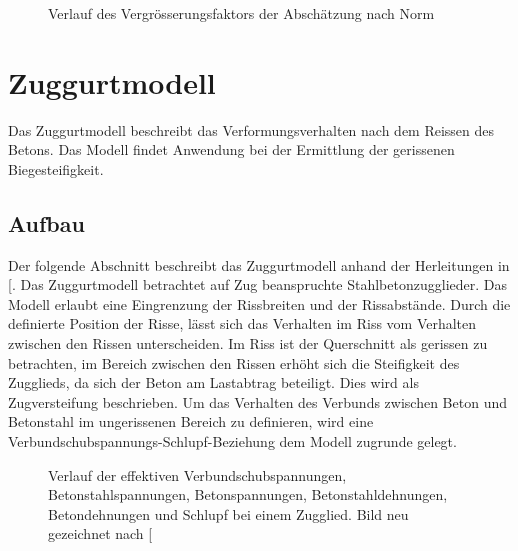 \documentclass[
  12pt,
  letterpaper,
  egregdoesnotlikesansseriftitles]{scrreprt}
\begin{document}
\begin{figure}[H]


\caption{\label{fig-fg}Verlauf des Vergrösserungsfaktors der Abschätzung
nach Norm}

\end{figure}%

\section{Zuggurtmodell}\label{sec-zuggurtmodell}

Das Zuggurtmodell beschreibt das Verformungsverhalten nach dem Reissen
des Betons. Das Modell findet Anwendung bei der Ermittlung der
gerissenen Biegesteifigkeit.

\subsection{Aufbau}\label{aufbau-2}

Der folgende Abschnitt beschreibt das Zuggurtmodell anhand der
Herleitungen in {[}\citeproc{ref-Spathelf2022}{4}{]}. Das Zuggurtmodell
betrachtet auf Zug beanspruchte Stahlbetonzugglieder. Das Modell erlaubt
eine Eingrenzung der Rissbreiten und der Rissabstände. Durch die
definierte Position der Risse, lässt sich das Verhalten im Riss vom
Verhalten zwischen den Rissen unterscheiden. Im Riss ist der Querschnitt
als gerissen zu betrachten, im Bereich zwischen den Rissen erhöht sich
die Steifigkeit des Zugglieds, da sich der Beton am Lastabtrag
beteiligt. Dies wird als Zugversteifung beschrieben. Um das Verhalten
des Verbunds zwischen Beton und Betonstahl im ungerissenen Bereich zu
definieren, wird eine Verbundschubspannungs-Schlupf-Beziehung dem Modell
zugrunde gelegt.

\begin{figure}[H]


\caption{\label{fig-zuggurtmodell}Verlauf der effektiven
Verbundschubspannungen, Betonstahlspannungen, Betonspannungen,
Betonstahldehnungen, Betondehnungen und Schlupf bei einem Zugglied. Bild
neu gezeichnet nach {[}\citeproc{ref-Spathelf2022}{4}{]}}

\end{figure}%
\end{document}
